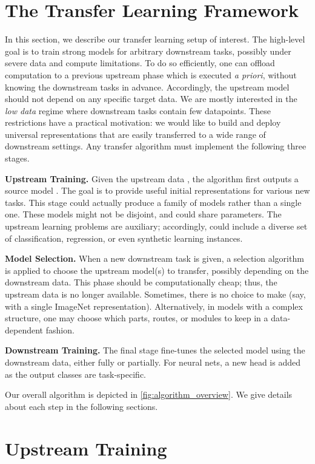 \documentclass{article}
\begin{document}
 \section{The Transfer Learning Framework}

In this section, we describe our transfer learning setup of interest.
The high-level goal is to train strong models for arbitrary downstream tasks, possibly under severe data and compute limitations.
To do so efficiently, one can offload computation 
to a previous upstream phase which is executed \emph{a priori}, without knowing the downstream tasks in advance.
Accordingly, the upstream model should not depend on any specific target data. 
We are mostly interested in the \emph{low data} regime where downstream tasks contain few datapoints.
These restrictions have a practical motivation: we would like to build and deploy universal representations that 
are easily transferred to a wide range of downstream settings.
Any transfer algorithm must implement the following three stages.

\textbf{Upstream Training.}
Given the upstream data , the algorithm first outputs a source model .
The goal is to provide useful initial representations for various new tasks.
This stage could actually produce a family of models  rather than a single one.
These models might not be disjoint, and could share parameters. 
The upstream learning problems are auxiliary; accordingly,  
could include a diverse set of classification, regression, or even synthetic learning instances.

\textbf{Model Selection.}
When a new downstream task is given, a selection algorithm is applied to choose the upstream model(s) to transfer, possibly depending on the downstream 
data. This phase should be computationally cheap; thus, the upstream data is no longer available.
Sometimes, there is no choice to make (say, with a single ImageNet representation).
Alternatively,
in models with a complex structure, one may choose which parts, routes, or modules to keep in a  data-dependent fashion.


\textbf{Downstream Training.}
The final stage fine-tunes the selected model using the downstream data, either fully or partially.
For neural nets, a new head is added as the output classes are task-specific. 



Our overall algorithm is depicted in \cref{fig:algorithm_overview}. We give details about each step in the
following sections. \section{Upstream Training}
\label{sec:upstream}
\end{document}
